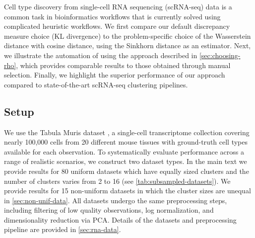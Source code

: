 Cell type discovery from single-cell RNA sequencing (scRNA-seq) data is a common task in bioinformatics workflows  
that is currently solved using complicated heuristic workflows. 
We first compare our default discrepancy measure choice (KL divergence) to 
the problem-specific choice of the Wasserstein distance with cosine distance, using the Sinkhorn distance as an estimator. %
Next, we illustrate the automation of \methodname using the approach described in \cref{sec:choosing-rho}, 
which provides comparable results to those obtained through manual selection.
Finally, we highlight the superior performance of our approach compared to state-of-the-art scRNA-seq clustering pipelines.

\subsection{Setup}

We use the Tabula Muris dataset \citep{mice}, a single-cell transcriptome collection covering nearly 100,000 cells from 20 different mouse tissues with ground-truth cell types available for each observation.
To systematically evaluate performance across a range of realistic scenarios, we construct two dataset types.
In the main text we provide results for 80 \textsf{uniform} datasets which have equally sized clusters and the number of clusters varies from 2 to 16 (see \cref{tab:subsampled-datasets}).
We provide results for 15 \textsf{non-uniform} datasets in which the cluster sizes are unequal in \cref{sec:non-unif-data}.
All datasets undergo the same preprocessing steps, including filtering of low quality observations, log normalization, and dimensionality reduction via PCA.
Details of the datasets and preprocessing pipeline are provided in \cref{sec:rna-data}.

